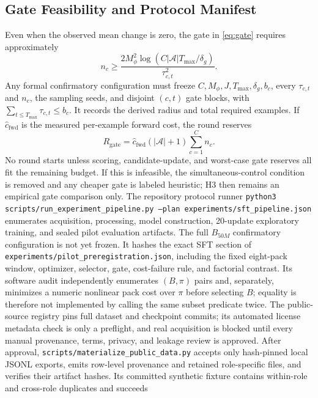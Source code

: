 \documentclass{article}
\begin{document}
\subsection{Gate Feasibility and Protocol Manifest}
Even when the observed mean change is zero, the gate in \cref{eq:gate}
requires approximately
\begin{equation}
n_c\ge
\frac{2M_\phi^2\log(C|\mathcal A|T_{\max}/\delta_g)}
{\tau_{c,t}^2}.
\end{equation}
Any formal confirmatory configuration must freeze
$C,M_\phi,J,T_{\max},\delta_g,b_c$, every
$\tau_{c,t}$ and $n_c$, the sampling seeds, and disjoint $(c,t)$ gate blocks,
with $\sum_{t\le T_{\max}}\tau_{c,t}\le b_c$. It records the derived radius
and total required examples. If $\widehat c_{\mathrm{fwd}}$ is the measured
per-example forward cost, the round reserves
\begin{equation}
R_{\mathrm{gate}}=\widehat c_{\mathrm{fwd}}
(|\mathcal A|+1)\sum_{c=1}^{C}n_c.
\end{equation}
No round starts unless scoring, candidate-update, and worst-case gate reserves
all fit the remaining budget. If this is infeasible, the simultaneous-control
condition is removed and any cheaper gate is labeled heuristic; H3 then remains
an empirical gate comparison only. The repository protocol runner
\texttt{python3 scripts/run\_experiment\_pipeline.py
--plan experiments/sft\_pipeline.json} enumerates acquisition, processing,
model construction, 20-update exploratory training, and sealed pilot evaluation
artifacts. The full $B_{50M}$ confirmatory configuration is not yet frozen.
It hashes the exact SFT section of
\texttt{experiments/pilot\_preregistration.json}, including the fixed
eight-pack window, optimizer, selector, gate, cost-failure rule, and factorial
contrast. Its software audit independently enumerates $(B,\pi)$ pairs and,
separately, minimizes a numeric nonlinear pack cost over $\pi$ before selecting
$B$; equality is therefore not implemented by calling the same subset
predicate twice. The public-source registry pins full dataset and checkpoint commits;
its automated license metadata check is only a preflight, and real acquisition
is blocked until every manual provenance, terms, privacy, and leakage review is
approved.
After approval, \texttt{scripts/materialize\_public\_data.py} accepts only
hash-pinned local JSONL exports, emits row-level provenance and retained
role-specific files, and verifies their artifact hashes. Its committed
synthetic fixture contains within-role and cross-role duplicates and succeeds
\end{document}
